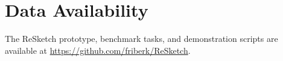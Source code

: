 \documentclass[sigconf,nonacm]{acmart}
\begin{document}
\section*{Data Availability}
The ReSketch prototype, benchmark tasks, and demonstration scripts are
available at \url{https://github.com/friberk/ReSketch}.



\end{document}
